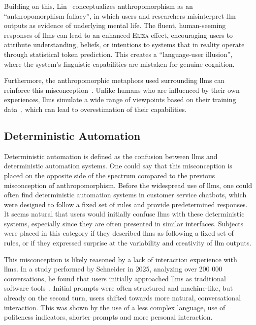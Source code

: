 Building on this, Lin\ \cite{lin_six_2025} conceptualizes anthropomorphism as an ``anthropomorphism fallacy'', in which users and researchers misinterpret \gls{llm} outputs as evidence of underlying mental life. The fluent, human-seeming responses of \gls{llms} can lead to an enhanced \textsc{Eliza} effect, encouraging users to attribute understanding, beliefs, or intentions to systems that in reality operate through statistical token prediction. This creates a ``language-user illusion'', where the system's linguistic capabilities are mistaken for genuine cognition. 

Furthermore, the anthropomorphic metaphors used surrounding \gls{llms} can reinforce this misconception\ \cite{lin_six_2025}. Unlike humans who are influenced by their own experiences, \gls{llms} simulate a wide range of viewpoints based on their training data\ \cite{lin_six_2025}, which can lead to overestimation of their capabilities.

\subsection{Deterministic Automation}\label{detauto}
Deterministic automation is defined as the confusion between \gls{llms} and deterministic automation systems. One could say that this misconception is placed on the opposite side of the spectrum compared to the previous misconception of anthropomorphism. Before the widespread use of \gls{llms}, one could often find deterministic automation systems in customer service chatbots, which were designed to follow a fixed set of rules and provide predetermined responses. It seems natural that users would initially confuse \gls{llms} with these deterministic systems, especially since they are often presented in similar interfaces. Subjects were placed in this category if they described \gls{llms} as following a fixed set of rules, or if they expressed surprise at the variability and creativity of \gls{llm} outputs.

This misconception is likely reasoned by a lack of interaction experience with \gls{llms}. In a study performed by Schneider in 2025, analyzing over 200 000 conversations, he found that users initially approached \gls{llms} as traditional software tools\ \cite{schneider_mental_2025}. Initial prompts were often structured and machine-like, but already on the second turn, users shifted towards more natural, conversational interaction. This was shown by the use of a less complex language, use of politeness indicators, shorter prompts and more personal interaction.

